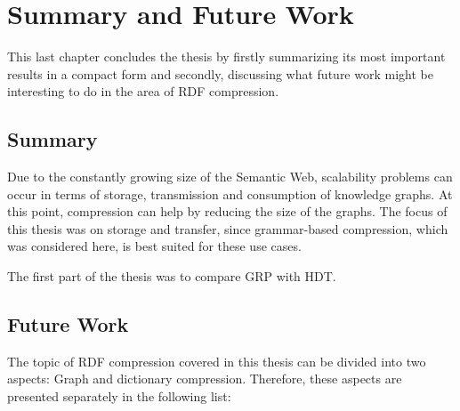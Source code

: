 \chapter{Summary and Future Work}\label{ch:summary_and_discussion}

This last chapter concludes the thesis by firstly summarizing its most important results in a compact form and secondly,  discussing what future work might be interesting to do in the area of RDF compression.

\section{Summary}

Due to the constantly growing size of the Semantic Web, scalability problems can occur in terms of storage, transmission and consumption of knowledge graphs. At this point, compression can help by reducing the size of the graphs. The focus of this thesis was on storage and transfer, since grammar-based compression, which was considered here, is best suited for these use cases. 

The first part of the thesis was to compare GRP with HDT. 

\section{Future Work}

The topic of RDF compression covered in this thesis can be divided into two aspects: Graph and dictionary compression. Therefore, these aspects are presented separately in the following list:

